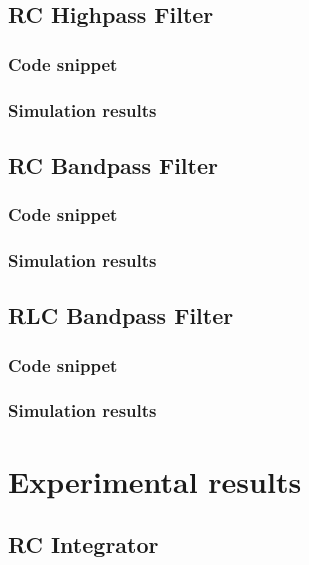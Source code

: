 \documentclass[12pt]{article}
\begin{document}
\subsection{RC Highpass Filter}
\subsubsection{Code snippet}

\subsubsection{Simulation results}

\subsection{RC Bandpass Filter}
\subsubsection{Code snippet}

\subsubsection{Simulation results}

\subsection{RLC Bandpass Filter}
\subsubsection{Code snippet}

\subsubsection{Simulation results}


\section{Experimental results}

\subsection{RC Integrator}
\end{document}
